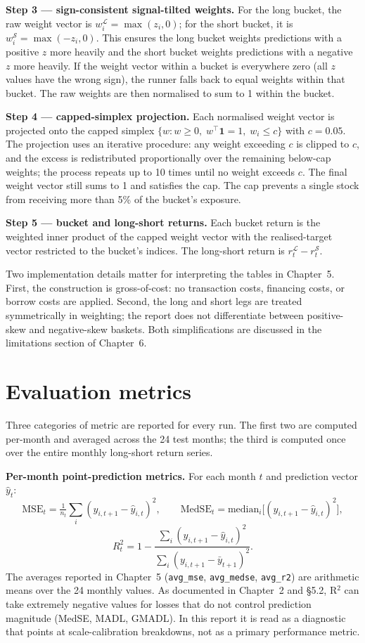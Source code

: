 \textbf{Step 3 --- sign-consistent signal-tilted weights.} For the long bucket, the raw weight vector is $w^{\mathcal{L}}_i = \max(z_i, 0)$; for the short bucket, it is $w^{\mathcal{S}}_i = \max(-z_i, 0)$. This ensures the long bucket weights predictions with a positive $z$ more heavily and the short bucket weights predictions with a negative $z$ more heavily. If the weight vector within a bucket is everywhere zero (all $z$ values have the wrong sign), the runner falls back to equal weights within that bucket. The raw weights are then normalised to sum to 1 within the bucket.

\textbf{Step 4 --- capped-simplex projection.} Each normalised weight vector is projected onto the capped simplex $\{w : w \ge 0, \; w^\top \mathbf{1} = 1, \; w_i \le c\}$ with $c = 0.05$. The projection uses an iterative procedure: any weight exceeding $c$ is clipped to $c$, and the excess is redistributed proportionally over the remaining below-cap weights; the process repeats up to 10 times until no weight exceeds $c$. The final weight vector still sums to 1 and satisfies the cap. The cap prevents a single stock from receiving more than 5\% of the bucket's exposure.

\textbf{Step 5 --- bucket and long-short returns.} Each bucket return is the weighted inner product of the capped weight vector with the realised-target vector restricted to the bucket's indices. The long-short return is $r^{\mathcal{L}}_t - r^{\mathcal{S}}_t$.

Two implementation details matter for interpreting the tables in Chapter~5. First, the construction is gross-of-cost: no transaction costs, financing costs, or borrow costs are applied. Second, the long and short legs are treated symmetrically in weighting; the report does not differentiate between positive-skew and negative-skew baskets. Both simplifications are discussed in the limitations section of Chapter~6.

\section{Evaluation metrics}

\label{sec:evaluation-metrics}

Three categories of metric are reported for every run. The first two are computed per-month and averaged across the 24 test months; the third is computed once over the entire monthly long-short return series.

\textbf{Per-month point-prediction metrics.} For each month $t$ and prediction vector $\hat y_t$:
\[
\mathrm{MSE}_t = \tfrac{1}{n_t} \textstyle\sum_i (y_{i,t+1} - \hat y_{i,t})^2,
\qquad
\mathrm{MedSE}_t = \mathrm{median}_i\big[(y_{i,t+1} - \hat y_{i,t})^2\big],
\]
\[
R^2_t = 1 - \frac{\sum_i (y_{i,t+1} - \hat y_{i,t})^2}{\sum_i (y_{i,t+1} - \bar y_{t+1})^2}.
\]
The averages reported in Chapter~5 (\texttt{avg\_mse}, \texttt{avg\_medse}, \texttt{avg\_r2}) are arithmetic means over the 24 monthly values. As documented in Chapter~2 and \S5.2, R$^2$ can take extremely negative values for losses that do not control prediction magnitude (MedSE, MADL, GMADL). In this report it is read as a diagnostic that points at scale-calibration breakdowns, not as a primary performance metric.

